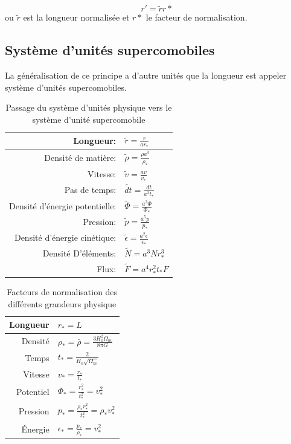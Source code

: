 \begin{equation}
r'=\tilde{r}r*
\end{equation}
ou $\tilde{r}$ est la longueur normalisée et $r*$ le facteur de normalisation.


\subsection{Système d'unités supercomobiles}
La généralisation de ce principe a d'autre unités que la longueur est appeler système d'unités supercomobiles.
\citep{martel_convenient_1998}

\begin{table}[htbp]
\begin{center}
\begin{tabular}{r l} \hline 
Longueur: & $\tilde{r}=\frac{r}{ar_*}$ \\ \hline 
Densité de matière: & $\tilde{\rho}=\frac{\rho a^3}{\rho_*}$ \\ \hline 
Vitesse: & $ \tilde{v}=\frac{av}{v_*}$ \\ \hline 
Pas de temps: & $\tilde{dt}=\frac{dt}{a^2t_*}$\\ \hline 
Densité d’énergie potentielle: & $\tilde{\Phi}=\frac{a^2 \Phi}{\Phi_*}$\\ \hline 
Pression: & $\tilde{p}=\frac{a^5 p}{p_*}$\\ \hline 
Densité d’énergie cinétique: & $\tilde{\epsilon}=\frac{a^2 \epsilon}{\epsilon_*}$\\ \hline 
Densité D’éléments: & $\tilde{N}=a^3 N r_*^3$\\ \hline 
Flux: & $\tilde{F}=a^4 r_*^2 t_* F$\\ \hline 
\end{tabular} 
\end{center}
\caption{Passage du système d'unités physique vers le système d'unité supercomobile} 
\end{table}

\begin{table}[htbp]
\begin{center}
\begin{tabular}{r l} \hline 
Longueur  & $r_*=L$\\ \hline 
Densité & $\rho_* = \bar{\rho} = \frac{3H_0^2 \Omega_m}{8\pi G}$\\ \hline 
Temps & $t_* = \frac{2}{H_0 \sqrt{\Omega_m}}$\\ \hline 
Vitesse & $v_* = \frac{r_*}{t_*}$\\ \hline 
Potentiel & $\Phi_* = \frac{r_*^2}{t_*^2} = v_*^2$\\ \hline 
Pression & $p_* = \frac{\rho_* r_*^2}{t_*^2} = \rho_* v_*^2$\\ \hline 
Énergie & $\epsilon_* = \frac{p_*}{\rho_*} = v_*^2$\\ \hline 
\end{tabular} 
\end{center}

\caption{Facteurs de normalisation des différents grandeurs physique} 
\end{table}




